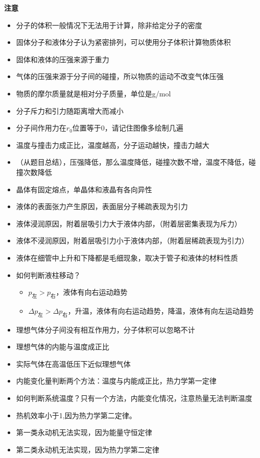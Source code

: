 \documentclass{cheatsheet}
\begin{document}
\textbf{注意}
\begin{itemize}
	\item 分子的体积一般情况下无法用于计算，除非给定分子的密度
	\item 固体分子和液体分子认为紧密排列，可以使用分子体积计算物质体积
	\item 固体和液体的压强来源于重力
	\item 气体的压强来源于分子间的碰撞，所以物质的运动不改变气体压强
	\item 物质的摩尔质量就是相对分子质量，单位是g/mol
	\item 分子斥力和引力随距离增大而减小
	\item 分子间作用力在$r_0$位置等于0，请记住图像多绘制几遍
	\item 温度与撞击力成正比，温度越高，分子运动越快，撞击力越大
	\item （从题目总结），压强降低，那么温度降低，碰撞次数不增，温度不降低，碰撞次数降低
	\item 晶体有固定熔点，单晶体和液晶有各向异性
	\item 液体的表面张力产生原因，表面层分子稀疏表现为引力
	\item 液体浸润原因，附着层吸引力大于液体内部，（附着层密集表现为斥力）
	\item 液体不浸润原因，附着层吸引力小于液体内部，（附着层稀疏表现为引力）
	\item 液体在细管中上升和下降都是毛细现象，取决于管子和液体的材料性质
	\item 如何判断液柱移动？
	\begin{itemize}
		\item[] $p_{\text{左}}>p_{\text{右}}$，液体有向右运动趋势
		\item[] $\Delta p_{\text{左}}>\Delta p_{\text{右}}$，升温，液体有向右运动趋势，降温，液体有向左运动趋势
	\end{itemize}
	\item 理想气体分子间没有相互作用力，分子体积可以忽略不计
	\item 理想气体的内能与温度成正比
	\item 实际气体在高温低压下近似理想气体
	\item 内能变化量判断两个方法：温度与内能成正比，热力学第一定律
	\item 如何判断系统温度？只有一个方法，内能变化情况，注意热量无法判断温度
	\item 热机效率小于1,因为热力学第二定律。
	\item 第一类永动机无法实现，因为能量守恒定律
	\item 第二类永动机无法实现，因为热力学第二定律
\end{itemize}
\end{document}
